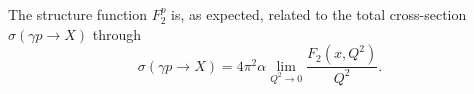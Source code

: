 \documentclass[a4paper,12pt]{article}
\begin{document}

The structure function $F^p_2$ is, as expected, related to the total cross-section $\sigma\left(\gamma p \rightarrow X\right)$ through
\begin{equation}
\sigma\left(\gamma p \rightarrow X\right) = 4 \pi^2 \alpha \lim_{Q^2 \rightarrow 0} \frac{F_2\left(x, Q^2\right)}{Q^2}.
\end{equation}
\end{document}
